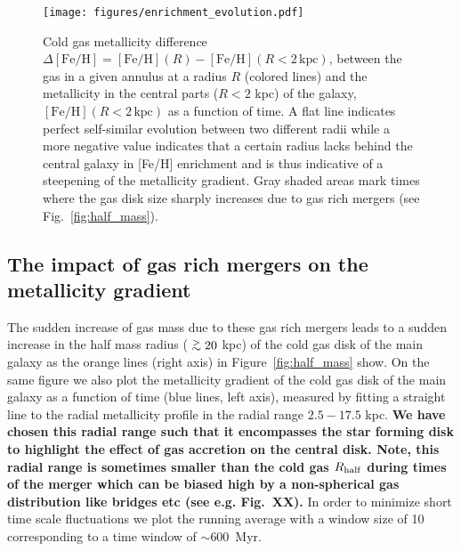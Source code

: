 \documentclass[useAMS,usenatbib]{mnras}
\newcommand{\gtsima}{$\; \buildrel > \over \sim \;$}
\newcommand{\gsim}{\lower.5ex\hbox{\gtsima}}
\begin{document}
\begin{figure*}
    \begin{centering}
        \texttt{[image: figures/enrichment\_evolution.pdf]}
        \vspace*{-1.75em}
        \caption{
            Cold gas metallicity difference $\Delta\mathrm{[Fe/H]}=\mathrm{[Fe/H]}(R)-\mathrm{[Fe/H]}(R<2\, \mathrm{kpc})$, between the gas in a given annulus at a radius $R$ (colored lines) and the metallicity in the central parts ($R<2$ kpc) of the galaxy, $\mathrm{[Fe/H]}(R<2\, \mathrm{kpc})$ as a function of time. A flat line indicates perfect self-similar evolution between two different radii while a more negative value indicates that a certain radius lacks behind the central galaxy in [Fe/H] enrichment and is thus indicative of a steepening of the metallicity gradient. Gray shaded areas mark times where the gas disk size sharply increases due to gas rich mergers (see Fig.~\ref{fig:half_mass}).
        }
        \label{fig:feh_evolution}
    \end{centering}
\end{figure*}

\subsection{The impact of gas rich mergers on the metallicity gradient} \label{sec:merger}

The sudden increase of gas mass due to these gas rich mergers leads to a sudden increase in the half mass radius ($\gsim20$ kpc) of the cold gas disk of the main galaxy as the orange lines (right axis) in Figure~\ref{fig:half_mass} show. On the same figure we also plot the metallicity gradient of the cold gas disk of the main galaxy as a function of time (blue lines, left axis), measured by fitting a straight line to the radial metallicity profile in the radial range $2.5 - 17.5$ kpc. \textbf{We have chosen this radial range such that it encompasses the star forming disk to highlight the effect of gas accretion on the central disk. Note, this radial range is sometimes smaller than the cold gas $R_{\rm half}$ during times of the merger which can be biased high by a non-spherical gas distribution like bridges etc (see e.g. Fig.~XX).} In order to minimize short time scale fluctuations we plot the running average with a window size of 10 corresponding to a time window of $\sim600$~Myr. 
\end{document}
